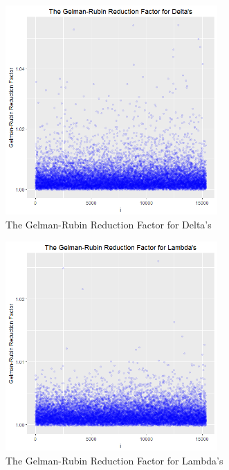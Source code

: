 \documentclass[twoside,onecolumn]{article}
\begin{document}
\begin{figure}[H]
\centering
\includegraphics[height=8cm]{gelman_delta_summary}
\caption{The Gelman-Rubin Reduction Factor for Delta's}
\label{fig:gelman_delta_summary}
\end{figure}

\begin{figure}[H]
\centering
\includegraphics[height=8cm]{gelman_lambda_summary}
\caption{The Gelman-Rubin Reduction Factor for Lambda's}
\label{fig:gelman_lambda_summary}
\end{figure}
\end{document}
